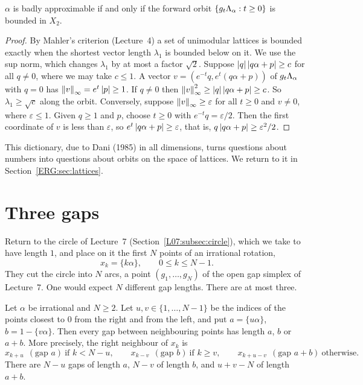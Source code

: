 \begin{proposition}\label{ERG:prop:dani}
$\alpha$ is badly approximable if and only if the forward orbit $\{g_t\Lambda_\alpha:t\ge0\}$ is bounded
in $X_2$.
\end{proposition}

\begin{proof}
By Mahler's criterion (Lecture~4) a set of unimodular lattices is bounded exactly when the shortest
vector length $\lambda_1$ is bounded below on it. We use the sup norm, which changes $\lambda_1$ by at
most a factor $\sqrt2$. Suppose $\left\lvert q \right\rvert\left\lvert q\alpha+p \right\rvert\ge c$ for all $q\neq0$, where we may take $c\le1$.
A vector $v=(e^{-t}q,e^t(q\alpha+p))$ of $g_t\Lambda_\alpha$ with $q=0$ has $\left\lVert v \right\rVert_\infty=e^t\left\lvert p \right\rvert\ge1$.
If $q\neq0$ then $\left\lVert v \right\rVert_\infty^2\ge\left\lvert q \right\rvert\left\lvert q\alpha+p \right\rvert\ge c$. So $\lambda_1\ge\sqrt c$ along the
orbit. Conversely, suppose $\left\lVert v \right\rVert_\infty\ge\varepsilon$ for all $t\ge0$ and $v\neq0$, where
$\varepsilon\le1$. Given $q\ge1$ and $p$, choose $t\ge0$ with $e^{-t}q=\varepsilon/2$. Then the first
coordinate of $v$ is less than $\varepsilon$, so $e^t\left\lvert q\alpha+p \right\rvert\ge\varepsilon$, that is,
$q\left\lvert q\alpha+p \right\rvert\ge\varepsilon^2/2$.
\end{proof}

This dictionary, due to Dani (1985) in all dimensions, turns questions about numbers into questions about
orbits on the space of lattices. We return to it in Section~\ref{ERG:sec:lattices}.

\section{Three gaps}
\label{ERG:sec:threegap}

Return to the circle of Lecture~7 (Section~\ref{L07:subsec:circle}), which we take to have length $1$, and
place on it the first $N$ points of an irrational rotation,
\[
  x_k=\{k\alpha\},\qquad 0\le k\le N-1 .
\]
They cut the circle into $N$ arcs, a point $(g_1,\dots,g_N)$ of the open gap simplex of Lecture~7. One
would expect $N$ different gap lengths. There are at most three.

\begin{theorem}\label{ERG:thm:threegap}
Let $\alpha$ be irrational and $N\ge2$. Let $u,v\in\{1,\dots,N-1\}$ be the indices of the points
closest to $0$ from the right and from the left, and put $a=\{u\alpha\}$, $b=1-\{v\alpha\}$. Then every
gap between neighbouring points has length $a$, $b$ or $a+b$. More precisely, the right neighbour of
$x_k$ is
\[
  x_{k+u}\ \ (\text{gap } a)\ \text{if } k<N-u,\qquad
  x_{k-v}\ \ (\text{gap } b)\ \text{if } k\ge v,\qquad
  x_{k+u-v}\ \ (\text{gap } a+b)\ \text{otherwise}.
\]
There are $N-u$ gaps of length $a$, $N-v$ of length $b$, and $u+v-N$ of length $a+b$.
\end{theorem}

